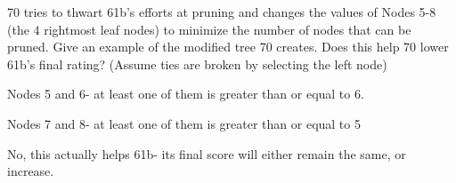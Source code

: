 \begin{parts}
\item 70 tries to thwart 61b's efforts at pruning and changes the values of Nodes 5-8 (the 4 rightmost leaf nodes) to minimize the number of nodes that can be pruned. Give an example of the modified tree 70 creates. Does this help 70 lower 61b's final rating? (Assume ties are broken by selecting the left node)

\ifprintanswers
\begin{solution}[2in]
Nodes 5 and 6- at least one of them is greater than or equal to 6.

Nodes 7 and 8- at least one of them is greater than or equal to 5

No, this actually helps 61b- its final score will either remain the same, or increase.
\end{solution}
\fi

\end{parts}


